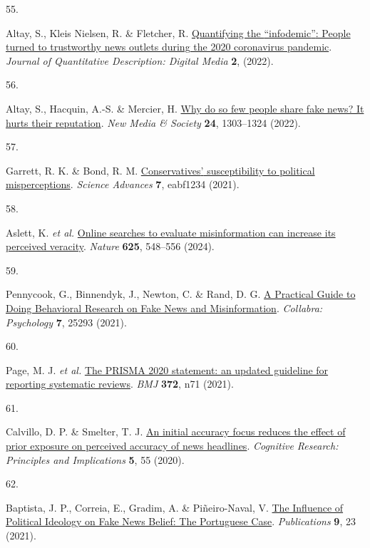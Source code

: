 \documentclass[
  man]{apa6}
\newlength{\cslhangindent}
\newlength{\csllabelwidth}
\newenvironment{CSLReferences}[2] %
 {\begin{list}{}{%
  \setlength{\itemindent}{0pt}
  \setlength{\leftmargin}{0pt}
  \setlength{\parsep}{0pt}
  \ifodd #1
   \setlength{\leftmargin}{\cslhangindent}
   \setlength{\itemindent}{-1\cslhangindent}
  \fi
  \setlength{\itemsep}{#2\baselineskip}}}
 {\end{list}}
\newcommand{\CSLLeftMargin}[1]{\parbox[t]{\csllabelwidth}{\strut#1\strut}}
\newcommand{\CSLRightInline}[1]{\parbox[t]{\linewidth - \csllabelwidth}{\strut#1\strut}}
\begin{document}
\begin{CSLReferences}{0}{0}
\CSLLeftMargin{55. }%
\CSLRightInline{Altay, S., Kleis Nielsen, R. \& Fletcher, R. \href{https://doi.org/10.51685/jqd.2022.020}{Quantifying the {``}infodemic{''}: People turned to trustworthy news outlets during the 2020 coronavirus pandemic}. \emph{Journal of Quantitative Description: Digital Media} \textbf{2}, (2022).}

\CSLLeftMargin{56. }%
\CSLRightInline{Altay, S., Hacquin, A.-S. \& Mercier, H. \href{https://doi.org/10.1177/1461444820969893}{Why do so few people share fake news? It hurts their reputation}. \emph{New Media \& Society} \textbf{24}, 1303--1324 (2022).}

\CSLLeftMargin{57. }%
\CSLRightInline{*Garrett, R. K. \& Bond, R. M. \href{https://doi.org/10.1126/sciadv.abf1234}{Conservatives{'} susceptibility to political misperceptions}. \emph{Science Advances} \textbf{7}, eabf1234 (2021).}

\CSLLeftMargin{58. }%
\CSLRightInline{*Aslett, K. \emph{et al.} \href{https://doi.org/10.1038/s41586-023-06883-y}{Online searches to evaluate misinformation can increase its perceived veracity}. \emph{Nature} \textbf{625}, 548--556 (2024).}

\CSLLeftMargin{59. }%
\CSLRightInline{*Pennycook, G., Binnendyk, J., Newton, C. \& Rand, D. G. \href{https://doi.org/10.1525/collabra.25293}{A Practical Guide to Doing Behavioral Research on Fake News and Misinformation}. \emph{Collabra: Psychology} \textbf{7}, 25293 (2021).}

\CSLLeftMargin{60. }%
\CSLRightInline{Page, M. J. \emph{et al.} \href{https://doi.org/10.1136/bmj.n71}{The PRISMA 2020 statement: an updated guideline for reporting systematic reviews}. \emph{BMJ} \textbf{372}, n71 (2021).}

\CSLLeftMargin{61. }%
\CSLRightInline{Calvillo, D. P. \& Smelter, T. J. \href{https://doi.org/10.1186/s41235-020-00257-y}{An initial accuracy focus reduces the effect of prior exposure on perceived accuracy of news headlines}. \emph{Cognitive Research: Principles and Implications} \textbf{5}, 55 (2020).}

\CSLLeftMargin{62. }%
\CSLRightInline{Baptista, J. P., Correia, E., Gradim, A. \& Piñeiro-Naval, V. \href{https://doi.org/10.3390/publications9020023}{The Influence of Political Ideology on Fake News Belief: The Portuguese Case}. \emph{Publications} \textbf{9}, 23 (2021).}


\end{CSLReferences}
\end{document}
